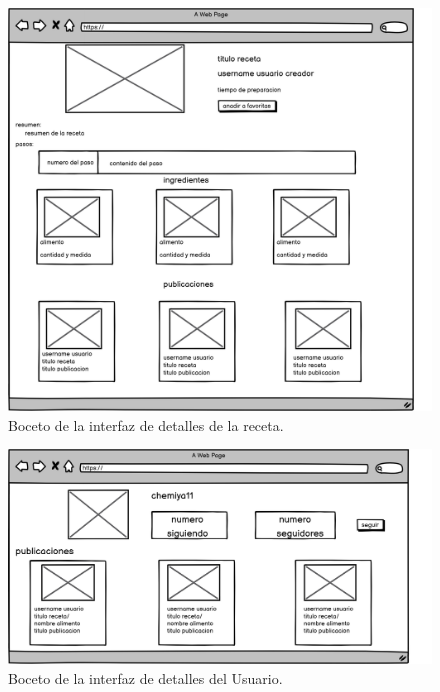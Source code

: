   

     \begin{figure}[H]
    \centering
    \includegraphics[scale=0.20]{img/detalle-receta.jpg}
    \caption{Boceto de la interfaz de detalles de la receta.}
    \label{fig:detalle-receta}
\end{figure}
    
   

     \begin{figure}[H]
    \centering
    \includegraphics[scale=0.20]{img/detalle-usuario.jpg}
    \caption{Boceto de la interfaz de detalles del Usuario.}
    \label{fig:detalle-usuario}
\end{figure}
    
   

